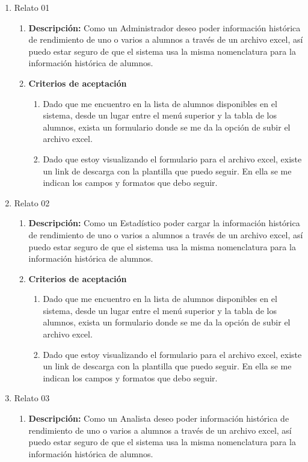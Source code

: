 \begin{enumerate}
	\item Relato 01
		\begin{enumerate}
			\item \textbf{Descripción:} Como un Administrador deseo poder información histórica de rendimiento de uno o varios a alumnos a través de un archivo excel, así puedo estar seguro de que el sistema usa la misma nomenclatura para la información histórica de alumnos.
			\item \textbf{Criterios de aceptación}
				\begin{enumerate}
					\item Dado que me encuentro en la lista de alumnos disponibles en el sistema, desde un lugar entre el menú superior y la tabla de los alumnos, exista un formulario donde se me da la opción de subir el archivo excel.
					\item Dado que estoy visualizando el formulario para el archivo excel, existe un link de descarga con la plantilla que puedo seguir. En ella se me indican los campos y formatos que debo seguir.
				\end{enumerate}
		\end{enumerate}
	\item Relato 02
		\begin{enumerate}
			\item \textbf{Descripción:} Como un Estadístico poder cargar la información histórica de rendimiento de uno o varios a alumnos a través de un archivo excel, así puedo estar seguro de que el sistema usa la misma nomenclatura para la información histórica de alumnos.
			\item \textbf{Criterios de aceptación}
				\begin{enumerate}
					\item Dado que me encuentro en la lista de alumnos disponibles en el sistema, desde un lugar entre el menú superior y la tabla de los alumnos, exista un formulario donde se me da la opción de subir el archivo excel.
					\item Dado que estoy visualizando el formulario para el archivo excel, existe un link de descarga con la plantilla que puedo seguir. En ella se me indican los campos y formatos que debo seguir.
				\end{enumerate}
		\end{enumerate}
	\item Relato 03
		\begin{enumerate}
			\item \textbf{Descripción:} Como un Analista deseo poder información histórica de rendimiento de uno o varios a alumnos a través de un archivo excel, así puedo estar seguro de que el sistema usa la misma nomenclatura para la información histórica de alumnos.

\end{enumerate}
\end{enumerate}
